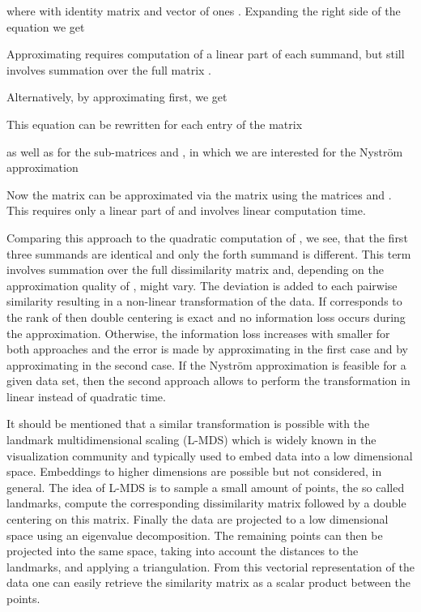 \documentclass[twoside,11pt]{article}
\begin{document}
where 
with identity matrix   and vector of ones .
Expanding the right side of the equation we get

Approximating  requires computation of a linear part of each summand,
but still involves summation over the full matrix .

Alternatively, by approximating  first, we get

This equation can be rewritten for each entry of the matrix 

as well as for the sub-matrices  and ,
in which we are interested for the Nystr\"om approximation 


Now the matrix  can be approximated via the matrix
 using the matrices
 and .
This requires only a linear part of  and involves linear computation time.

Comparing this approach to the quadratic computation of ,
we see, that the first three summands are identical
and only the forth summand is different.
This term involves summation over the full dissimilarity matrix
and, depending on the approximation quality of , might vary.
The deviation is added to each pairwise similarity
resulting in a non-linear transformation of the data.
If  corresponds to the rank of 
then double centering is exact
and no information loss occurs during the approximation.
Otherwise, the information loss increases with smaller 
for both approaches
and the error is made by approximating  in the first case
and by approximating  in the second case.
If the Nystr\"om approximation is feasible for a given data set,
then the second approach allows
to perform the transformation in linear instead of quadratic time.

It should be mentioned that a similar transformation is possible with
the landmark multidimensional scaling (L-MDS) \cite{DBLP:conf/nips/SilvaT02}
which is widely known in the visualization community and typically used to 
embed data into a low  dimensional space. Embeddings to higher dimensions
are possible but not considered, in general.
The idea of L-MDS is to sample a small amount  of points, the so called landmarks,
compute the corresponding dissimilarity matrix
followed by a double centering on this matrix.
Finally the data are projected to a low dimensional space
using an eigenvalue decomposition.
The remaining points can then be projected into the same space,
taking into account the distances to the landmarks, and applying a triangulation.
From this vectorial representation of the data
one can easily retrieve the similarity
matrix as a scalar product between the points.
\end{document}

